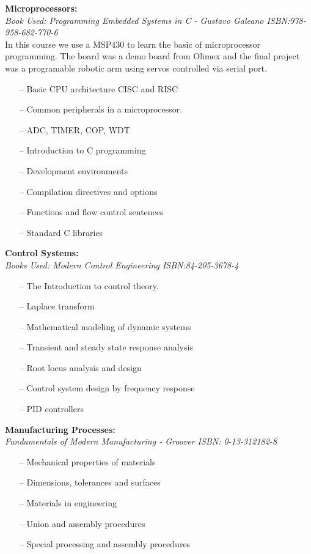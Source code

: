\documentclass{article}
\begin{document}
\textbf{Microprocessors:}\\
    \emph{Book Used: Programming Embedded Systems in C - Gustavo Galeano ISBN:978-958-682-770-6}\\
    In this course we use a MSP430 to learn the basic of microprocessor programming.
    The board was a demo board from Olimex and the final project was a programable
    robotic arm using servos controlled via serial port.
    \begin{itemize}
     \setlength\itemsep{0pt}
        \item[--] Basic CPU architecture CISC and RISC
        \item[--] Common peripherals in a microprocessor.
        \item[--] ADC, TIMER, COP, WDT
        \item[--] Introduction to C programming
        \item[--] Development environments
        \item[--] Compilation directives and options
        \item[--] Functions and flow control sentences
        \item[--] Standard C libraries
    \end{itemize}


\textbf{Control Systems:}\\
    \emph{Books Used: Modern Control Engineering ISBN:84-205-3678-4}
    \begin{itemize}
     \setlength\itemsep{0pt}
        \item[--] The Introduction to control theory.
        \item[--] Laplace transform
        \item[--] Mathematical modeling of dynamic systems
        \item[--] Transient and steady state response analysis
        \item[--] Root locus analysis and design
        \item[--] Control system design by frequency response
        \item[--] PID controllers
    \end{itemize}


\textbf{Manufacturing Processes:}\\
    \emph{Fundamentals of Modern Manufacturing - Groover ISBN: 0-13-312182-8}
    \begin{itemize}
     \setlength\itemsep{0pt}
        \item[--] Mechanical properties of materials
        \item[--] Dimensions, tolerances and surfaces
        \item[--] Materials in engineering
        \item[--] Union and assembly procedures
        \item[--] Special processing and assembly procedures
    \end{itemize}
\end{document}
